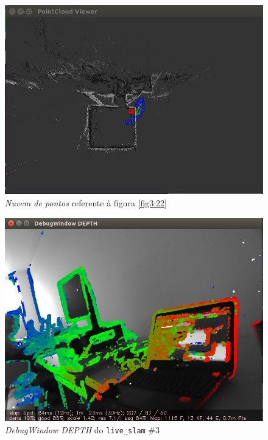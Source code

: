 \begin{figure}[H]
	\centering
		\includegraphics[width= \textwidth]{Imagens/figura3-23.jpg}
	\caption{\textit{Nuvem de pontos} referente à figura \ref{fig3:22}}
	\label{fig3:23}
\end{figure}

\begin{figure}[H]
	\centering
		\includegraphics[width= \textwidth]{Imagens/figura3-24.jpg}
	\caption{\textit{DebugWindow DEPTH} do \texttt{live\_slam} \#3}
	\label{fig3:24}
\end{figure}

